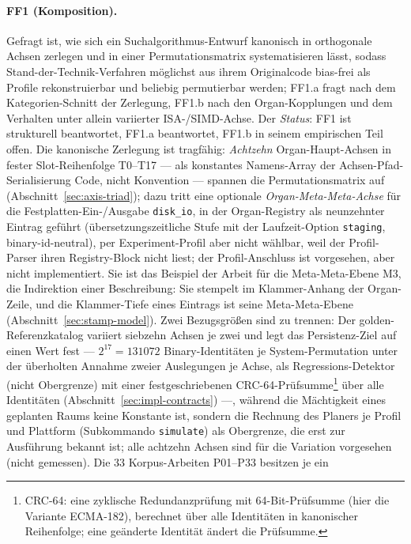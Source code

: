 \begin{nurlang}
\paragraph{FF1 (Komposition).} Gefragt ist, wie sich ein Suchalgorithmus-Entwurf kanonisch in
orthogonale Achsen zerlegen und in einer Permutationsmatrix systematisieren lässt, sodass
Stand-der-Technik-Verfahren möglichst aus ihrem Originalcode bias-frei als Profile rekonstruierbar
und beliebig permutierbar werden; FF1.a
fragt nach dem Kategorien-Schnitt der Zerlegung, FF1.b nach den Organ-Kopplungen und dem Verhalten unter
allein variierter ISA-/SIMD-Achse. Der \emph{Status}: FF1 ist strukturell beantwortet, FF1.a beantwortet,
FF1.b in seinem empirischen Teil offen. Die kanonische Zerlegung ist tragfähig: \emph{Achtzehn}
Organ-Haupt-Achsen in fester Slot-Reihenfolge T0--T17 --- als konstantes Namens-Array der
Achsen-Pfad-Serialisierung Code, nicht Konvention --- spannen die Permutationsmatrix auf
(Abschnitt~\ref{sec:axis-triad}); dazu tritt eine optionale \emph{Organ-Meta-Meta-Achse} für die
Festplatten-Ein-/Ausgabe \texttt{disk\_io}, in der Organ-Registry als neunzehnter Eintrag geführt
(übersetzungszeitliche Stufe mit der Laufzeit-Option \texttt{staging}, binary-id-neutral), per
Experiment-Profil aber nicht wählbar, weil der Profil-Parser ihren Registry-Block nicht liest; der
Profil-Anschluss ist vorgesehen, aber nicht implementiert. Sie ist das Beispiel der Arbeit für die
Meta-Meta-Ebene M3, die Indirektion einer Beschreibung: Sie stempelt im Klammer-Anhang der Organ-Zeile,
und die Klammer-Tiefe eines Eintrags ist seine Meta-Meta-Ebene (Abschnitt~\ref{sec:stamp-model}). Zwei
Bezugsgrößen sind zu trennen: Der golden-Referenzkatalog variiert siebzehn Achsen je zwei und legt das
Persistenz-Ziel auf einen Wert fest --- $2^{17} = 131072$ Binary-Identitäten je System-Permutation unter der
überholten Annahme zweier Auslegungen je Achse, als Regressions-Detektor (nicht Obergrenze) mit einer festgeschriebenen CRC-64-Prüfsumme\footnote{CRC-64: eine zyklische
Redundanzprüfung mit 64-Bit-Prüfsumme (hier die Variante ECMA-182), berechnet über alle Identitäten in
kanonischer Reihenfolge; eine geänderte Identität ändert die Prüfsumme.} über alle Identitäten
(Abschnitt~\ref{sec:impl-contracts}) ---, während die Mächtigkeit eines geplanten Raums keine Konstante
ist, sondern die Rechnung des Planers je Profil und Plattform (Subkommando \texttt{simulate}) als Obergrenze, die
erst zur Ausführung bekannt ist; alle
achtzehn Achsen sind für die Variation vorgesehen (nicht gemessen). Die 33 Korpus-Arbeiten P01--P33 besitzen je ein

\end{nurlang}
